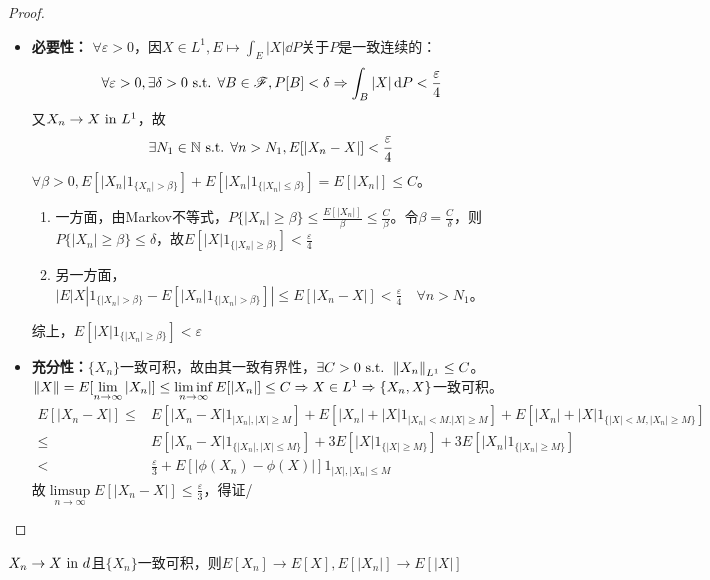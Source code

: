 \documentclass{ctexbook}
\begin{document}
\begin{proof}
  \begin{itemize}
  
  \item \textbf{必要性：} $\forall\varepsilon>0$，因$X\in L^{1},E\mapsto \int_{E}|X|\dd P$关于$P$是一致连续的：
    \[\forall\varepsilon>0,\exists \delta>0\text{ s.t. }\forall B\in\mathscr{F}, P[B]<\delta\Rightarrow \int_{B}|X|\,\mathrm{d} P<\frac{\varepsilon}{4}\]
    又$X_{n}\to X\text{ in } L^{1}$，故
    \[\exists N_{1}\in\mathbb{N}\text{ s.t. } \forall n>N_{1}, E[|X_{n}-X|]<\frac{\varepsilon}{4}\]
    $\forall\beta>0, E[|X_{n}|1_{\{X_{n}|>\beta\}}]+E[|X_{n}|1_{\{|X_{n}|\leq\beta\}}]=E[|X_{n}|]\leq C$。
    \begin{enumerate}
    \item 一方面，由Markov不等式，$P\{|X_{n}|\geq \beta\}\leq\frac{E[|X_{n}|]}{\beta}\leq\frac{C}{\beta} $。令$\beta=\frac{C}{\delta}$，则$P\{|X_{n}|\geq \beta\}\leq \delta$，故$E[|X|1_{\{|X_{n}|\geq \beta\}}]<\frac{\varepsilon}{4}$
   
    \item  另一方面，$|E|X|1_{\{|X_{n}|>\beta\}}-E[|X_{n}|1_{\{|X_{n}|>\beta\}}]|\leq E[|X_{n}-X|]<\frac{\varepsilon}{4}\quad\forall n>N_{1}$。
    \end{enumerate}
   综上，$E[|X|1_{\{|X_{n}|\geq \beta\}}]<\varepsilon$

  
 \item \textbf{充分性：}$\{X_{n}\}$一致可积，故由其一致有界性，$\exists C>0\text{ s.t. } \left\|X_{n}\right\|_{L^{1}}\leq C$。$\left\|X\right\|=E[\lim\limits_{n\to\infty}|X_{n}|]\leq \liminf\limits_{n\to\infty}E[|X_{n}|]\leq C\Rightarrow X\in L^{1}\Rightarrow \{X_{n},X\}$一致可积。
\begin{align*}
  E[|X_{n}-X|]\leq& E[|X_{n}-X|1_{|X_{n}|,|X|\geq M}]+E[|X_{n}|+|X|1_{|X_{n}|<M.|X|\geq M}]+E[|X_{n}|+|X|1_{\{|X|<M,|X_{n}|\geq M\}}]\\
  \leq& E[|X_{n}-X|1_{\{|X_{n}|,|X|\leq M\}}]+3E[|X|1_{\{|X|\geq M\}}]+3E[|X_{n}|1_{\{|X_{n}|\geq M\}}]\\
  <&\frac{\varepsilon}{3}+E[|\phi(X_{n})-\phi(X)|]1_{|X|,|X_{n}|\leq M}
\end{align*}
   故$ \limsup\limits_{n\to\infty} E[|X_{n}-X|]\leq\frac{\varepsilon}{3} $，得证/
   \end{itemize}
\end{proof}

\begin{Cor}
  $X_{n}\to X\text{ in } d$且$\{X_{n}\}$一致可积，则$E[X_{n}]\to E[X], E[|X_{n}|]\to E[|X|]$
\end{Cor}
\end{document}
